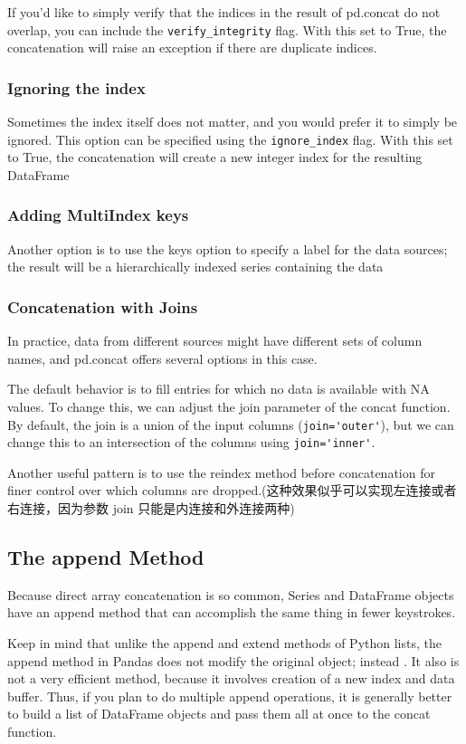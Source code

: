 If you'd like to simply verify that the indices in the result of pd.concat do not overlap,
you can include the \verb|verify_integrity| flag. With this set to True, the concatenation
will raise an exception if there are duplicate indices.
\subsubsection*{Ignoring the index}
Sometimes the index itself does not matter, and you would prefer it to simply be
ignored. This option can be specified using the \verb|ignore_index| flag. With this set to
True, the concatenation will create a new integer index for the resulting DataFrame
\subsubsection*{Adding MultiIndex keys}
Another option is to use the keys option to specify a label for the data sources; the
result will be a hierarchically indexed series containing the data
\subsubsection*{Concatenation with Joins}
In practice, data from different sources might have different sets of column names, and pd.concat offers several options in this case.

The default behavior is to fill entries for which no data is available with NA values. To
change this, we can adjust the join parameter of the concat function. By default, the
join is a union of the input columns (\verb|join='outer'|), but we can change this to an
intersection of the columns using \verb|join='inner'|.

Another useful pattern is to use the reindex method before concatenation for finer
control over which columns are dropped.(这种效果似乎可以实现左连接或者右连接，因为参数 join 只能是内连接和外连接两种)
\subsection*{The append Method}
Because direct array concatenation is so common, Series and DataFrame objects
have an append method that can accomplish the same thing in fewer keystrokes.

Keep in mind that unlike the append and extend methods of Python lists, the append
method in Pandas does not modify the original object; instead . It also is not a very efficient method, because it involves creation of a new index and data buffer. Thus, if you plan to do multiple append operations, it is generally better to build a list of DataFrame objects and pass them all at once to the concat function.


